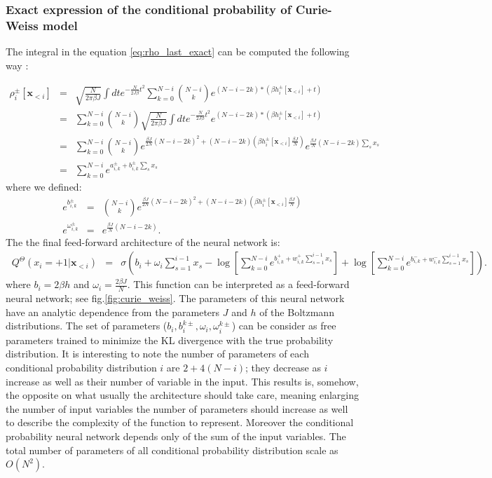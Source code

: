 \documentclass{article}
\begin{document}
 \subsubsection{Exact expression of the conditional probability of Curie-Weiss model}
 The integral in the equation \ref{eq:rho_last_exact} can be computed the following way :

 \begin{eqnarray*}
 \rho_i^{\pm}[\mathbf{x}_{<i}] &=& \sqrt{\frac{N}{2\pi \beta J}}\int dt e^{-\frac{N}{2J \beta}t^{2}} 
 \sum_{k=0}^{N-i} \binom{N-i}{k} e^{(N-i-2k)*(\beta h_i^{\pm}[\mathbf{x}_{<i}] + t)}\\
 &=& \sum_{k=0}^{N-i} \binom{N-i}{k} \sqrt{\frac{N}{2\pi \beta J}}\int dt e^{-\frac{N}{2J \beta}t^{2}} 
  e^{(N-i-2k)*(\beta h_i^{\pm}[\mathbf{x}_{<i}] + t)}\\
&=& \sum_{k=0}^{N-i} \binom{N-i}{k}e^{\frac{\beta J}{2N}\left(N-i-2k\right)^{2}+\left(N-i-2k\right)\left(\beta h_i^{\pm}[\mathbf{x}_{<i}]\frac{\beta J}{N}\right)} e^{\frac{\beta J}{N}\left(N-i-2k\right) \sum_s x_s} \\
&=& \sum_{k=0}^{N-i} e^{a_{i,k}^{\pm} + b_{i,k}^{\pm} \sum_s x_s} 
\end{eqnarray*}
where we defined:
\begin{eqnarray}
\label{eq:params}
e^{b_{i,k}^{\pm}} & = & \binom{N-i}{k}e^{\frac{\beta J}{2N}\left(N-i-2k\right)^{2}+\left(N-i-2k\right)\left(\beta h_i^{\pm}[\mathbf{x}_{<i}]\frac{\beta J}{N}\right)}\\
e^{\omega_{i,k}^{\pm}} & = & e^{\frac{\beta J}{N}\left(N-i-2k\right)}.
\end{eqnarray}
The the final feed-forward architecture of the neural network is:
\begin{eqnarray}\
\label{eq:curie_weiss_cond}
Q^{\Theta}\left(x_{i}=+1|\mathbf{x}_{<i}\right) & = &  \sigma \left(b_{i}+\omega_{i}\sum_{s=1}^{i-1}x_{s}-\log\left[\sum_{k=0}^{N-i}e^{b_{i,k}^{+}+w_{i,k}^{+}\sum_{s=1}^{i-1}x_{s}}\right]+\log\left[\sum_{k=0}^{N-i}e^{b_{i,k}^{-} + w_{i,k}^{-}\sum_{s=1}^{i-1}x_{s}}\right]\right).
\end{eqnarray}
where $b_i=2\beta h$ and $\omega_i=\frac{2\beta J}{N}$. 
\newline
This function can be interpreted as a feed-forward neural network; see fig.\ref{fig:curie_weiss}. 
The parameters of this neural network have an analytic dependence from the parameters $J$ and $h$ of the Boltzmann distributions. 
The set of parameters ($b_i, b_i^{k\pm}, \omega_i, \omega_i^{k\pm}$) can be consider as free parameters trained to minimize the KL divergence with the true probability distribution. 
It is interesting to note the number of parameters of each conditional probability distribution $i$ are $2+4(N-i)$; they decrease as $i$ increase as well as their number of variable in the input. This results is, somehow, the opposite on what usually the architecture should take care, meaning enlarging the number of input variables the number of parameters should increase as well to describe the complexity of the function to represent. Moreover the conditional probability neural network depends only of the sum of the input variables.
The total number of parameters of all conditional probability distribution scale as $O(N^2)$. 
\end{document}

